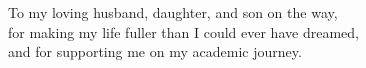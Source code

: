 \vspace*{\fill}

\begin{center}
    To my loving husband, daughter, and son on the way, \\
    for making my life fuller than I could ever have dreamed,\\
    and for supporting me on my academic journey.
\end{center}

\vspace*{\fill}
